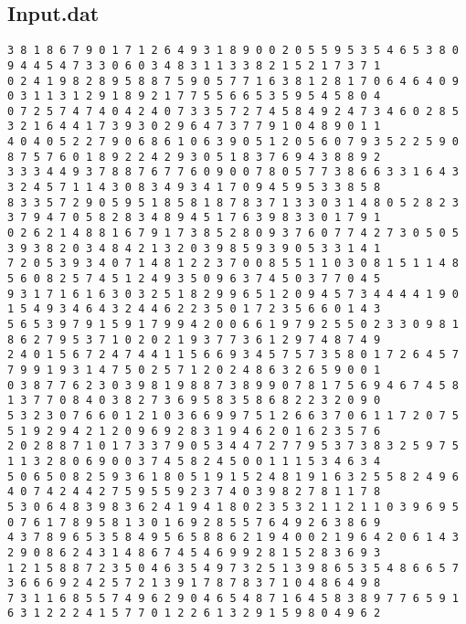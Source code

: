 \subsection{Input.dat}
\begin{verbatim}
3 8 1 8 6 7 9 0 1 7 1 2 6 4 9 3 1 8 9 0 0 2 0 5 5 9 5 3 5 4 6 5 3 8 0 9 4 4 5 4 7 3 3 0 6 0 3 4 8 3 1 1 3 3 8 2 1 5 2 1 7 3 7 1
0 2 4 1 9 8 2 8 9 5 8 8 7 5 9 0 5 7 7 1 6 3 8 1 2 8 1 7 0 6 4 6 4 0 9 0 3 1 1 3 1 2 9 1 8 9 2 1 7 7 5 5 6 6 5 3 5 9 5 4 5 8 0 4
0 7 2 5 7 4 7 4 0 4 2 4 0 7 3 3 5 7 2 7 4 5 8 4 9 2 4 7 3 4 6 0 2 8 5 3 2 1 6 4 4 1 7 3 9 3 0 2 9 6 4 7 3 7 7 9 1 0 4 8 9 0 1 1
4 0 4 0 5 2 2 7 9 0 6 8 6 1 0 6 3 9 0 5 1 2 0 5 6 0 7 9 3 5 2 2 5 9 0 8 7 5 7 6 0 1 8 9 2 2 4 2 9 3 0 5 1 8 3 7 6 9 4 3 8 8 9 2
3 3 3 4 4 9 3 7 8 8 7 6 7 7 6 0 9 0 0 7 8 0 5 7 7 3 8 6 6 3 3 1 6 4 3 3 2 4 5 7 1 1 4 3 0 8 3 4 9 3 4 1 7 0 9 4 5 9 5 3 3 8 5 8
8 3 3 5 7 2 9 0 5 9 5 1 8 5 8 1 8 7 8 3 7 1 3 3 0 3 1 4 8 0 5 2 8 2 3 3 7 9 4 7 0 5 8 2 8 3 4 8 9 4 5 1 7 6 3 9 8 3 3 0 1 7 9 1
0 2 6 2 1 4 8 8 1 6 7 9 1 7 3 8 5 2 8 0 9 3 7 6 0 7 7 4 2 7 3 0 5 0 5 3 9 3 8 2 0 3 4 8 4 2 1 3 2 0 3 9 8 5 9 3 9 0 5 3 3 1 4 1
7 2 0 5 3 9 3 4 0 7 1 4 8 1 2 2 3 7 0 0 8 5 5 1 1 0 3 0 8 1 5 1 1 4 8 5 6 0 8 2 5 7 4 5 1 2 4 9 3 5 0 9 6 3 7 4 5 0 3 7 7 0 4 5
9 3 1 7 1 6 1 6 3 0 3 2 5 1 8 2 9 9 6 5 1 2 0 9 4 5 7 3 4 4 4 4 1 9 0 1 5 4 9 3 4 6 4 3 2 4 4 6 2 2 3 5 0 1 7 2 3 5 6 6 0 1 4 3
5 6 5 3 9 7 9 1 5 9 1 7 9 9 4 2 0 0 6 6 1 9 7 9 2 5 5 0 2 3 3 0 9 8 1 8 6 2 7 9 5 3 7 1 0 2 0 2 1 9 3 7 7 3 6 1 2 9 7 4 8 7 4 9
2 4 0 1 5 6 7 2 4 7 4 4 1 1 5 6 6 9 3 4 5 7 5 7 3 5 8 0 1 7 2 6 4 5 7 7 9 9 1 9 3 1 4 7 5 0 2 5 7 1 2 0 2 4 8 6 3 2 6 5 9 0 0 1
0 3 8 7 7 6 2 3 0 3 9 8 1 9 8 8 7 3 8 9 9 0 7 8 1 7 5 6 9 4 6 7 4 5 8 1 3 7 7 0 8 4 0 3 8 2 7 3 6 9 5 8 3 5 8 6 8 2 2 3 2 0 9 0
5 3 2 3 0 7 6 6 0 1 2 1 0 3 6 6 9 9 7 5 1 2 6 6 3 7 0 6 1 1 7 2 0 7 5 5 1 9 2 9 4 2 1 2 0 9 6 9 2 8 3 1 9 4 6 2 0 1 6 2 3 5 7 6
2 0 2 8 8 7 1 0 1 7 3 3 7 9 0 5 3 4 4 7 2 7 7 9 5 3 7 3 8 3 2 5 9 7 5 1 1 3 2 8 0 6 9 0 0 3 7 4 5 8 2 4 5 0 0 1 1 1 5 3 4 6 3 4
5 0 6 5 0 8 2 5 9 3 6 1 8 0 5 1 9 1 5 2 4 8 1 9 1 6 3 2 5 5 8 2 4 9 6 4 0 7 4 2 4 4 2 7 5 9 5 5 9 2 3 7 4 0 3 9 8 2 7 8 1 1 7 8
5 3 0 6 4 8 3 9 8 3 6 2 4 1 9 4 1 8 0 2 3 5 3 2 1 1 2 1 1 0 3 9 6 9 5 0 7 6 1 7 8 9 5 8 1 3 0 1 6 9 2 8 5 5 7 6 4 9 2 6 3 8 6 9
4 3 7 8 9 6 5 3 5 8 4 9 5 6 5 8 8 6 2 1 9 4 0 0 2 1 9 6 4 2 0 6 1 4 3 2 9 0 8 6 2 4 3 1 4 8 6 7 4 5 4 6 9 9 2 8 1 5 2 8 3 6 9 3
1 2 1 5 8 8 7 2 3 5 0 4 6 3 5 4 9 7 3 2 5 1 3 9 8 6 5 3 5 4 8 6 6 5 7 3 6 6 6 9 2 4 2 5 7 2 1 3 9 1 7 8 7 8 3 7 1 0 4 8 6 4 9 8
7 3 1 1 6 8 5 5 7 4 9 6 2 9 0 4 6 5 4 8 7 1 6 4 5 8 3 8 9 7 7 6 5 9 1 6 3 1 2 2 2 4 1 5 7 7 0 1 2 2 6 1 3 2 9 1 5 9 8 0 4 9 6 2

\end{verbatim}

